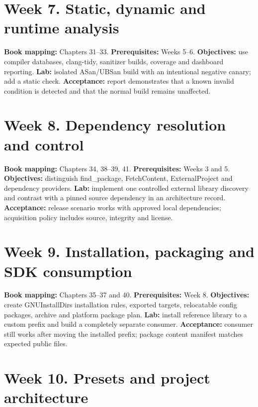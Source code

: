\documentclass[11pt,letterpaper,oneside]{report}
\begin{document}
\section{Week 7. Static, dynamic and runtime
analysis}\label{week-7.-static-dynamic-and-runtime-analysis}

\textbf{Book mapping:} Chapters 31--33. \textbf{Prerequisites:} Weeks
5--6. \textbf{Objectives:} use compiler databases, clang-tidy, sanitizer
builds, coverage and dashboard reporting. \textbf{Lab:} isolated
ASan/UBSan build with an intentional negative canary; add a static
check. \textbf{Acceptance:} report demonstrates that a known invalid
condition is detected and that the normal build remains unaffected.

\section{Week 8. Dependency resolution and
control}\label{week-8.-dependency-resolution-and-control}

\textbf{Book mapping:} Chapters 34, 38--39, 41. \textbf{Prerequisites:}
Weeks 3 and 5. \textbf{Objectives:} distinguish find\_package,
FetchContent, ExternalProject and dependency providers. \textbf{Lab:}
implement one controlled external library discovery and contrast with a
pinned source dependency in an architecture record. \textbf{Acceptance:}
release scenario works with approved local dependencies; acquisition
policy includes source, integrity and license.

\section{Week 9. Installation, packaging and SDK
consumption}\label{week-9.-installation-packaging-and-sdk-consumption}

\textbf{Book mapping:} Chapters 35--37 and 40. \textbf{Prerequisites:}
Week 8. \textbf{Objectives:} create GNUInstallDirs installation rules,
exported targets, relocatable config packages, archive and platform
package plan. \textbf{Lab:} install reference library to a custom prefix
and build a completely separate consumer. \textbf{Acceptance:} consumer
still works after moving the installed prefix; package content manifest
matches expected public files.

\section{Week 10. Presets and project
architecture}\label{week-10.-presets-and-project-architecture}
\end{document}
